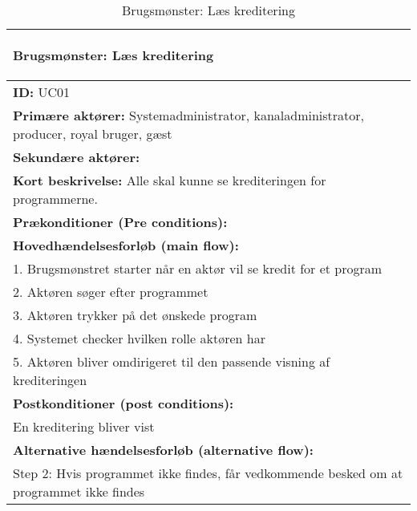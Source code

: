 \begin{table}[H]
\centering
\begin{tabular}{|p{16cm}|}
\hline
    \begin{center}{}
    \textbf{Brugsmønster:}  Læs kreditering  
    \end{center} \\ \hline
    
	\textbf{ID:} UC01 \\ \hline
	\textbf{Primære aktører:} Systemadministrator, kanaladministrator, producer, royal bruger, gæst \\ \hline
	\textbf{Sekundære aktører:} \\ \hline
	\textbf{Kort beskrivelse:} Alle skal kunne se krediteringen for programmerne. \\ \hline
	\textbf{Prækonditioner (Pre conditions):} \\ \hline
\textbf{Hovedhændelsesforløb (main flow):} \\
1. Brugsmønstret starter når en aktør vil se kredit for et program \\
2. Aktøren søger efter programmet \\
3. Aktøren trykker på det ønskede program \\
4. Systemet checker hvilken rolle aktøren har \\
5. Aktøren bliver omdirigeret til den passende visning af krediteringen \\ \hline
    \textbf{	Postkonditioner (post conditions):} \\
    En kreditering bliver vist \\ \hline

	\textbf{Alternative hændelsesforløb (alternative flow):} \\
Step 2: Hvis programmet ikke findes, får vedkommende besked om at programmet ikke findes \\ 
\hline
\end{tabular}
\label{tab:read_credits}
\caption{Brugsmønster: Læs kreditering}
\end{table}
